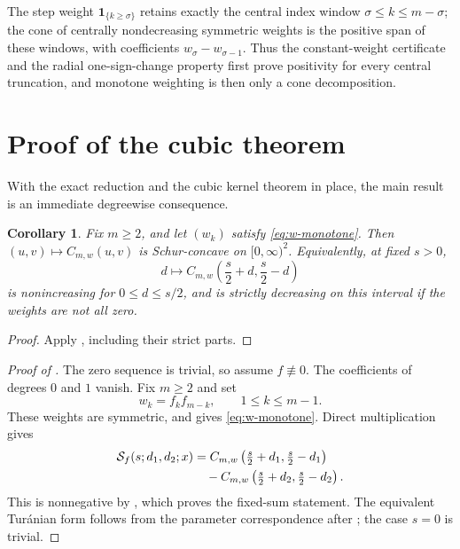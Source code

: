 \documentclass[11pt,a4paper]{amsart}
\numberwithin{equation}{section}
\theoremstyle{plain}
\newtheorem{corollary}[theorem]{Corollary}
\theoremstyle{definition}
\begin{document}
The step weight \(\mathbf1_{\{k\ge\sigma\}}\) retains exactly the central index
window \(\sigma\le k\le m-\sigma\); the cone of centrally nondecreasing symmetric
weights is the positive span of these windows, with coefficients
\(w_\sigma-w_{\sigma-1}\).  Thus the constant-weight certificate and the radial
one-sign-change property first prove positivity for every central truncation, and
monotone weighting is then only a cone decomposition.


\section{Proof of the cubic theorem}\label{sec:cubic-proof}

With the exact reduction and the cubic kernel theorem in place, the main result is an
immediate degreewise consequence.

\begin{corollary}
\label{cor:C-schur}
Fix \(m\ge2\), and let \((w_k)\) satisfy
\eqref{eq:w-monotone}.  Then \((u,v)\mapsto C_{m,w}(u,v)\) is Schur-concave on
\([0,\infty)^2\).  Equivalently, at fixed \(s>0\),
\[
 d\longmapsto C_{m,w}\left(\frac s2+d,\frac s2-d\right)
\]
is nonincreasing for \(0\le d\le s/2\), and is strictly decreasing on this
interval if the weights are not all zero.
\end{corollary}

\begin{proof}
Apply , including their strict parts.
\end{proof}

\begin{proof}[Proof of ]
The zero sequence is trivial, so assume \(f\not\equiv0\).  The coefficients of
degrees \(0\) and \(1\) vanish.  Fix \(m\ge2\) and set
\begin{equation}\label{eq:w-from-f}
 w_k=f_kf_{m-k},\qquad 1\le k\le m-1.
\end{equation}
These weights are symmetric, and  gives
\eqref{eq:w-monotone}.  Direct multiplication gives
\begin{align}
 [x^m]\mathcal S_f(s;d_1,d_2;x)
 &=C_{m,w}\left(\tfrac s2+d_1,\tfrac s2-d_1\right)\notag\\
 &\quad-C_{m,w}\left(\tfrac s2+d_2,\tfrac s2-d_2\right).
 \label{eq:delta-C}
\end{align}
This is nonnegative by , which proves the fixed-sum
statement.  The equivalent Tur\'anian form follows from the parameter
correspondence after ; the case \(s=0\) is trivial.
\end{proof}
\end{document}
